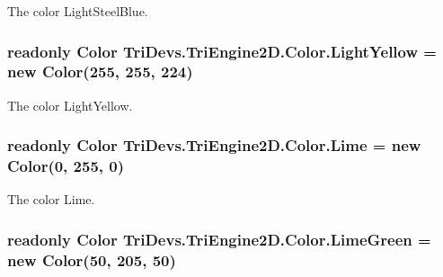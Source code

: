 The color Light\-Steel\-Blue. 

\hypertarget{struct_tri_devs_1_1_tri_engine2_d_1_1_color_a5a25f591f013f71e14287213c17034d6}{
\subsubsection[{Light\-Yellow}]{\setlength{\rightskip}{0pt plus 5cm}readonly {\bf Color} Tri\-Devs.\-Tri\-Engine2\-D.\-Color.\-Light\-Yellow = new {\bf Color}(255, 255, 224)\hspace{0.3cm}{\ttfamily [static]}}}\label{struct_tri_devs_1_1_tri_engine2_d_1_1_color_a5a25f591f013f71e14287213c17034d6}


The color Light\-Yellow. 

\hypertarget{struct_tri_devs_1_1_tri_engine2_d_1_1_color_ae5a9929e09ff5744c2e89ac254267338}{
\subsubsection[{Lime}]{\setlength{\rightskip}{0pt plus 5cm}readonly {\bf Color} Tri\-Devs.\-Tri\-Engine2\-D.\-Color.\-Lime = new {\bf Color}(0, 255, 0)\hspace{0.3cm}{\ttfamily [static]}}}\label{struct_tri_devs_1_1_tri_engine2_d_1_1_color_ae5a9929e09ff5744c2e89ac254267338}


The color Lime. 

\hypertarget{struct_tri_devs_1_1_tri_engine2_d_1_1_color_a0fa79e4d81a23ea27516d615d7268cd5}{
\subsubsection[{Lime\-Green}]{\setlength{\rightskip}{0pt plus 5cm}readonly {\bf Color} Tri\-Devs.\-Tri\-Engine2\-D.\-Color.\-Lime\-Green = new {\bf Color}(50, 205, 50)\hspace{0.3cm}{\ttfamily [static]}}}\label{struct_tri_devs_1_1_tri_engine2_d_1_1_color_a0fa79e4d81a23ea27516d615d7268cd5}


